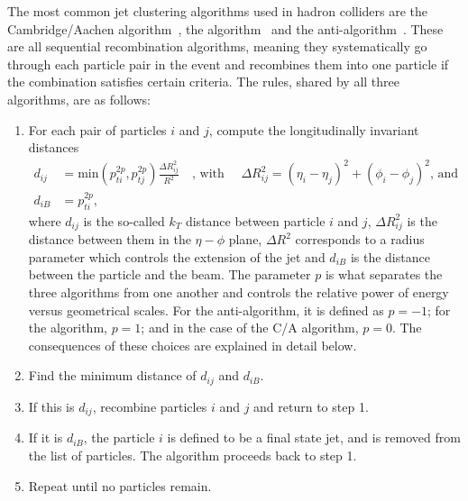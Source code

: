 The most common jet clustering algorithms used in hadron colliders are the Cambridge/Aachen algorithm~\cite{Dokshitzer:1997in}, the \kt algorithm~\cite{Ellis:1993tq} and the anti-\kt algorithm~\cite{Cacciari:2008gp}. These are all sequential recombination algorithms, meaning they systematically go through each particle pair in the event and recombines them into one particle if the combination satisfies certain criteria. The rules, shared by all three algorithms, are as follows:
\begin{enumerate}
  \itemsep0em 
\item For each pair of particles $i$ and $j$, compute the longitudinally invariant distances
  \begin{align}
    \label{eq:objreco:jetclustering1}  
  d_{ij} &= \textrm{min}(p_{ti}^{2p},p_{tj}^{2p})\frac{\Delta R^2_{ij}}{R^2} \quad \textrm{, with } \quad \Delta R^2_{ij}=(\eta_i - \eta_j)^2+(\phi_i - \phi_j)^2 \textrm{, and }\\
  \label{eq:objreco:jetclustering2}  
  d_{iB} &= p_{ti}^{2p},
  \end{align}  
  where $d_{ij}$ is the so-called $k_T$ distance between particle $i$ and $j$, $\Delta R^2_{ij}$ is the distance between them in the $\eta-\phi$ plane, $\Delta R^2$ corresponds to a radius parameter which controls the extension of the jet and $d_{iB}$ is the distance between the particle and the beam. The parameter $p$ is what separates the three algorithms from one another and controls the relative power of energy versus geometrical
scales. For the anti-\kt algorithm, it is defined as $p=-1$; for the \kt algorithm, $p=1$; and in the case of the C/A algorithm, $p=0$. The consequences of these choices are explained in detail below.
  \item Find the minimum distance of $d_{ij}$ and $d_{iB}$.
  \item If this is $d_{ij}$, recombine particles $i$ and $j$ and return to step 1.
  \item If it is $d_{iB}$, the particle $i$ is defined to be a final state jet, and is removed from the list of particles. The algorithm proceeds back to step 1.
  \item Repeat until no particles remain.
\end{enumerate}

